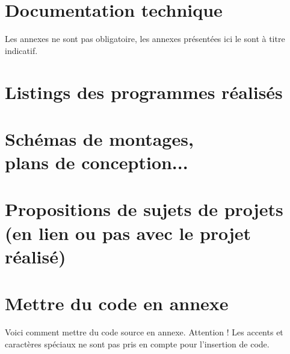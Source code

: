 \documentclass[a4paper, 12pt]{report} %
\begin{document}
\appendix

	\chapter{Documentation technique}

Les annexes ne sont pas obligatoire, les annexes présentées ici le sont à titre indicatif.
	\chapter{Listings des programmes réalisés}
	\chapter{Schémas de montages, \\plans de conception...}
	\chapter{Propositions de sujets de projets \\ (en lien ou pas avec le projet réalisé)}
	\chapter{Mettre du code en annexe}

	Voici comment mettre du code source en annexe. Attention ! Les accents et caractères spéciaux ne sont pas pris en compte pour l'insertion de code.
\end{document}
